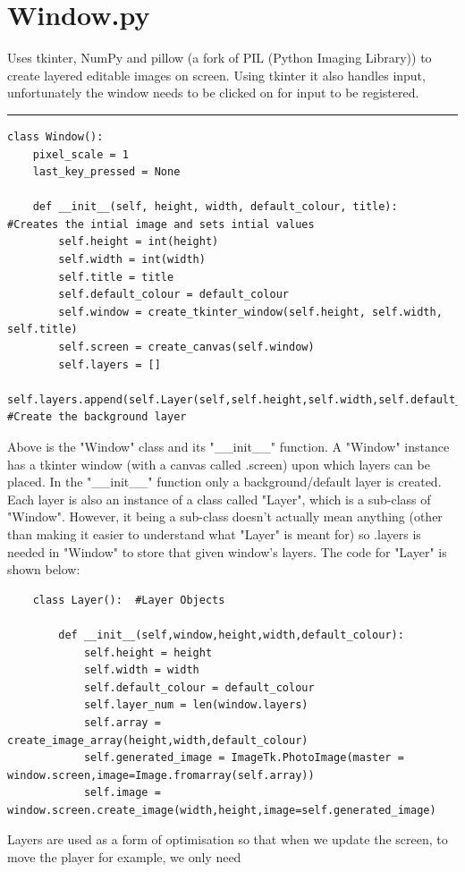 
\clearpage
\section{Window.py}
Uses tkinter, NumPy and pillow (a fork of PIL (Python Imaging Library)) to create layered editable images on screen. Using tkinter it also handles input, unfortunately the window needs to be clicked on for input to be registered.

\textcolor[RGB]{220,220,220}{\rule{\linewidth}{0.2pt}}
\begin{lstlisting}
class Window():
    pixel_scale = 1
    last_key_pressed = None
    
    def __init__(self, height, width, default_colour, title):   #Creates the intial image and sets intial values
        self.height = int(height)
        self.width = int(width)
        self.title = title
        self.default_colour = default_colour
        self.window = create_tkinter_window(self.height, self.width, self.title)
        self.screen = create_canvas(self.window)
        self.layers = []
        self.layers.append(self.Layer(self,self.height,self.width,self.default_colour)) #Create the background layer
\end{lstlisting}
Above is the "Window" class and its "\_\_init\_\_" function. A "Window" instance has a tkinter window (with a canvas called .screen) upon which
layers can be placed. In the "\_\_init\_\_" function only a background/default layer is created. Each layer is also an instance of
a class called "Layer", which is a sub-class of "Window". However, it being a sub-class doesn't actually mean anything (other than making it easier to
understand what "Layer" is meant for) so .layers is needed in "Window" to store that given window's layers. The code for "Layer" is shown below:
\begin{lstlisting}
    class Layer():  #Layer Objects

        def __init__(self,window,height,width,default_colour):
            self.height = height
            self.width = width
            self.default_colour = default_colour
            self.layer_num = len(window.layers)
            self.array = create_image_array(height,width,default_colour)
            self.generated_image = ImageTk.PhotoImage(master = window.screen,image=Image.fromarray(self.array))
            self.image = window.screen.create_image(width,height,image=self.generated_image)
\end{lstlisting}
Layers are used as a form of optimisation so that when we update the screen, to move the player for example, we only need
